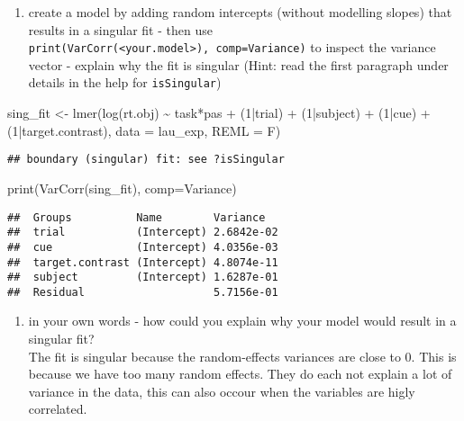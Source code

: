 \documentclass[
]{article}
\newenvironment{Shaded}{\begin{snugshade}}{\end{snugshade}}
\newcommand{\AttributeTok}[1]{\textcolor[rgb]{0.77,0.63,0.00}{#1}}
\newcommand{\DecValTok}[1]{\textcolor[rgb]{0.00,0.00,0.81}{#1}}
\newcommand{\FunctionTok}[1]{\textcolor[rgb]{0.00,0.00,0.00}{#1}}
\newcommand{\NormalTok}[1]{#1}
\newcommand{\OtherTok}[1]{\textcolor[rgb]{0.56,0.35,0.01}{#1}}
\newcommand{\SpecialCharTok}[1]{\textcolor[rgb]{0.00,0.00,0.00}{#1}}
\newcommand{\StringTok}[1]{\textcolor[rgb]{0.31,0.60,0.02}{#1}}
\providecommand{\tightlist}{%
  \setlength{\itemsep}{0pt}\setlength{\parskip}{0pt}}
\begin{document}
\begin{enumerate}
\def\labelenumi{\roman{enumi}.}
\setcounter{enumi}{1}
\tightlist
\item
  create a model by adding random intercepts (without modelling slopes)
  that results in a singular fit - then use
  \texttt{print(VarCorr(\textless{}your.model\textgreater{}),\ comp=\textquotesingle{}Variance\textquotesingle{})}
  to inspect the variance vector - explain why the fit is singular
  (Hint: read the first paragraph under details in the help for
  \texttt{isSingular})
\end{enumerate}

\begin{Shaded}
\begin{Highlighting}[]
\NormalTok{sing\_fit }\OtherTok{\textless{}{-}} \FunctionTok{lmer}\NormalTok{(}\FunctionTok{log}\NormalTok{(rt.obj) }\SpecialCharTok{\textasciitilde{}}\NormalTok{ task}\SpecialCharTok{*}\NormalTok{pas }\SpecialCharTok{+}\NormalTok{ (}\DecValTok{1}\SpecialCharTok{|}\NormalTok{trial) }\SpecialCharTok{+}\NormalTok{ (}\DecValTok{1}\SpecialCharTok{|}\NormalTok{subject) }\SpecialCharTok{+}\NormalTok{ (}\DecValTok{1}\SpecialCharTok{|}\NormalTok{cue) }\SpecialCharTok{+}\NormalTok{ (}\DecValTok{1}\SpecialCharTok{|}\NormalTok{target.contrast), }\AttributeTok{data =}\NormalTok{ lau\_exp, }\AttributeTok{REML =}\NormalTok{ F)}
\end{Highlighting}
\end{Shaded}

\begin{verbatim}
## boundary (singular) fit: see ?isSingular
\end{verbatim}

\begin{Shaded}
\begin{Highlighting}[]
\FunctionTok{print}\NormalTok{(}\FunctionTok{VarCorr}\NormalTok{(sing\_fit), }\AttributeTok{comp=}\StringTok{\textquotesingle{}Variance\textquotesingle{}}\NormalTok{)}
\end{Highlighting}
\end{Shaded}

\begin{verbatim}
##  Groups          Name        Variance  
##  trial           (Intercept) 2.6842e-02
##  cue             (Intercept) 4.0356e-03
##  target.contrast (Intercept) 4.8074e-11
##  subject         (Intercept) 1.6287e-01
##  Residual                    5.7156e-01
\end{verbatim}

\begin{enumerate}
\def\labelenumi{\roman{enumi}.}
\setcounter{enumi}{2}
\tightlist
\item
  in your own words - how could you explain why your model would result
  in a singular fit?\\
  The fit is singular because the random-effects variances are close to
  0. This is because we have too many random effects. They do each not
  explain a lot of variance in the data, this can also occour when the
  variables are higly correlated.
\end{enumerate}
\end{document}
